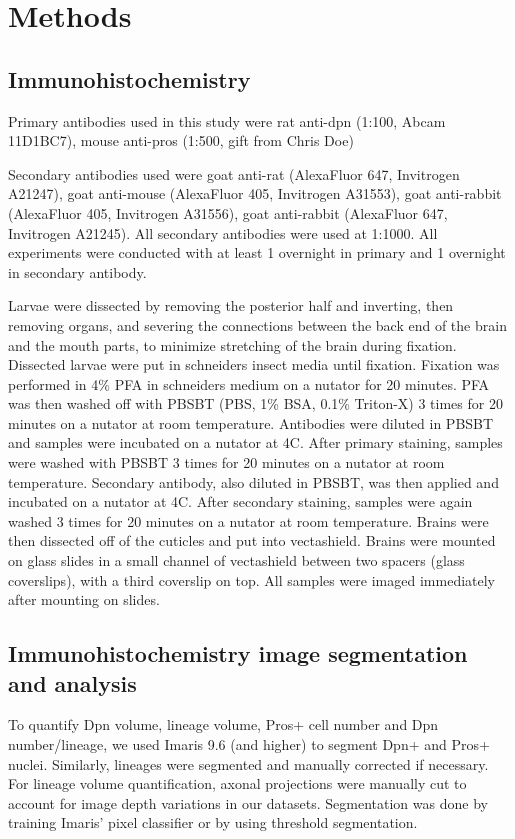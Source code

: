 \section{Methods}

\subsection{Immunohistochemistry}
Primary antibodies used in this study were rat anti-dpn (1:100, Abcam 11D1BC7), mouse anti-pros (1:500, gift from Chris Doe)

Secondary antibodies used were goat anti-rat (AlexaFluor 647, Invitrogen A21247), goat anti-mouse (AlexaFluor 405, Invitrogen A31553), goat anti-rabbit (AlexaFluor 405, Invitrogen A31556), goat anti-rabbit (AlexaFluor 647, Invitrogen A21245). All secondary antibodies were used at 1:1000. All experiments were conducted with at least 1 overnight in primary and 1 overnight in secondary antibody.

Larvae were dissected by removing the posterior half and inverting, then removing organs, and severing the connections between the back end of the brain and the mouth parts, to minimize stretching of the brain during fixation.
Dissected larvae were put in schneiders insect media until fixation. Fixation was performed in 4\% PFA in schneiders medium on a nutator for 20 minutes.
PFA was then washed off with PBSBT (PBS, 1\% BSA, 0.1\% Triton-X) 3 times for 20 minutes on a nutator at room temperature.
Antibodies were diluted in PBSBT and samples were incubated on a nutator at 4C. After primary staining, samples were washed with PBSBT 3 times for 20 minutes on a nutator at room temperature.
Secondary antibody, also diluted in PBSBT, was then applied and incubated on a nutator at 4C.
After secondary staining, samples were again washed 3 times for 20 minutes on a nutator at room temperature.
Brains were then dissected off of the cuticles and put into vectashield.
Brains were mounted on glass slides in a small channel of vectashield between two spacers (glass coverslips), with a third coverslip on top.
All samples were imaged immediately after mounting on slides.

\subsection{Immunohistochemistry image segmentation and analysis}

To quantify Dpn volume, lineage volume, Pros+ cell number and Dpn number/lineage, we used Imaris 9.6 (and higher) to segment Dpn+ and Pros+ nuclei. Similarly, lineages were segmented and manually corrected if necessary. For lineage volume quantification, axonal projections were manually cut to account for image depth variations in our datasets. Segmentation was done by training Imaris’ pixel classifier or by using threshold segmentation.

